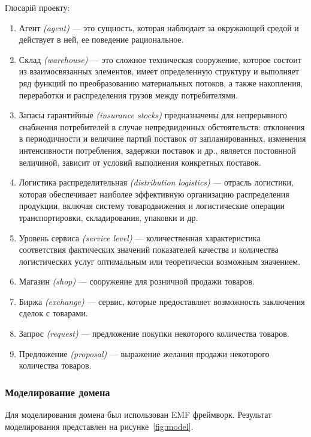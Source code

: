 Глосарій проекту:
\begin{enumerate}
    \item Агент \textit{(agent)} --- это сущность, которая наблюдает за окружающей средой и действует в ней, ее поведение рациональное.
    \item Склад \textit{(warehouse)} --- это сложное техническая сооружение, которое состоит из взаимосвязанных элементов, имеет определенную структуру и выполняет ряд функций по преобразованию материальных потоков, а также накопления, переработки и распределения грузов между потребителями.
	\item Запасы гарантийные \textit{(insurance stocks)} предназначены для непрерывного снабжения потребителей в случае непредвиденных обстоятельств: отклонения в периодичности и величине партий поставок от запланированных, изменения интенсивности потребления, задержки поставок и др., является постоянной величиной, зависит от условий выполнения конкретных поставок.
	\item Логистика распределительная \textit{(distribution logistics)} --- отрасль логистики, которая обеспечивает наиболее эффективную организацию распределения продукции, включая систему товародвижения и логистические операции транспортировки, складирования, упаковки и др.
	\item Уровень сервиса \textit{(service level)} --- количественная характеристика соответствия фактических значений показателей качества и количества логистических услуг оптимальным или теоретически возможным значением.
    \item Магазин \textit{(shop)} --- сооружение для розничной продажи товаров.
    \item Биржа \textit{(exchange)} --- сервис, которые предоставляет возможность заключения сделок с товарами.
    \item Запрос \textit{(request)} --- предложение покупки некоторого количества товаров.
    \item Предложение \textit{(proposal)} --- выражение желания продажи некоторого количества товаров.
\end{enumerate}

\subsubsection{Моделирование домена}
Для моделирования домена был использован EMF фреймворк. 
Результат моделирования представлен на рисунке~\ref{fig:model}. 

